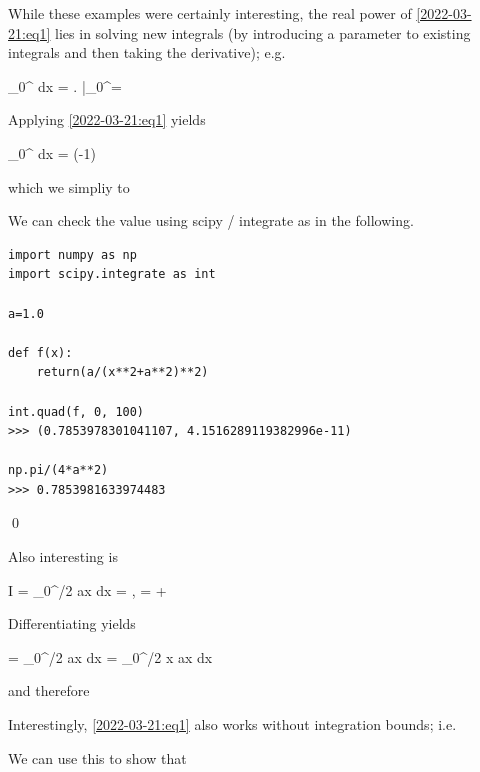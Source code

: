 While these examples were certainly interesting, the real power of \eqref{2022-03-21:eq1} lies in solving new integrals (by introducing a parameter to existing integrals and then taking the derivative); e.g.

\bee
\int_0^\infty {} dx =  \left. \arctan {} \right|_0^\infty = 
\eee

Applying \eqref{2022-03-21:eq1} yields

\bee
\int_0^\infty {} dx = (-1) 
\eee

which we simpliy to

\bee
{}
\eee

We can check the value using scipy / integrate as in the following.

\begin{verbatim}
import numpy as np
import scipy.integrate as int

a=1.0

def f(x):
    return(a/(x**2+a**2)**2)

int.quad(f, 0, 100)
>>> (0.7853978301041107, 4.1516289119382996e-11)
    
np.pi/(4*a**2)
>>> 0.7853981633974483
\end{verbatim}

\qed


Also interesting is

\bee
I = \int_0^{\pi/2} \sin ax dx = , \quad {} =  + 
\eee

Differentiating yields

\bee
{} = \int_0^{\pi/2} \sin ax dx = \int_0^{\pi/2} x \cos ax dx
\eee

and therefore

\bee
{}
\eee

Interestingly, \eqref{2022-03-21:eq1} also works without integration bounds; i.e.

\bee
{}
\eee

We can use this to show that

\bee
{}
\eee

